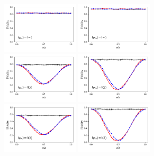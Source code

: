 \documentclass[a4paper]{article}
\begin{document}
\begin{figure}[H]
	\\
	\includegraphics[width=0.35\textwidth]{fidelity_qc3_mit1_state3}
	\includegraphics[width=0.35\textwidth]{fidelity_qc3_mit0_state3}
	\\
	\includegraphics[width=0.35\textwidth]{fidelity_qc3_mit1_state4}
	\includegraphics[width=0.35\textwidth]{fidelity_qc3_mit0_state4}
	\\
	\includegraphics[width=0.35\textwidth]{fidelity_qc3_mit1_state5}
	\includegraphics[width=0.35\textwidth]{fidelity_qc3_mit0_state5}
\end{figure}
\end{document}
